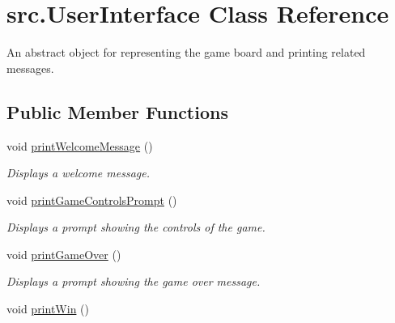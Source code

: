 \hypertarget{classsrc_1_1UserInterface}{}\section{src.\+User\+Interface Class Reference}
\label{classsrc_1_1UserInterface}


An abstract object for representing the game board and printing related messages.  


\subsection*{Public Member Functions}
\begin{DoxyCompactItemize}
\item 
\mbox{\label{classsrc_1_1UserInterface_a30f0e6f6aa7b09b00704c6eb5fff7c1d}} 
void \hyperlink{classsrc_1_1UserInterface_a30f0e6f6aa7b09b00704c6eb5fff7c1d}{print\+Welcome\+Message} ()
\begin{DoxyCompactList}\small\item\em Displays a welcome message. \end{DoxyCompactList}\item 
\mbox{\label{classsrc_1_1UserInterface_a0544e50c7da5b4a7996434556ba3028d}} 
void \hyperlink{classsrc_1_1UserInterface_a0544e50c7da5b4a7996434556ba3028d}{print\+Game\+Controls\+Prompt} ()
\begin{DoxyCompactList}\small\item\em Displays a prompt showing the controls of the game. \end{DoxyCompactList}\item 
\mbox{\label{classsrc_1_1UserInterface_acba54ffce06b835010ed5568239a8f00}} 
void \hyperlink{classsrc_1_1UserInterface_acba54ffce06b835010ed5568239a8f00}{print\+Game\+Over} ()
\begin{DoxyCompactList}\small\item\em Displays a prompt showing the game over message. \end{DoxyCompactList}\item 
\mbox{\label{classsrc_1_1UserInterface_a5b7ad41a8c9a4c4b7852c9c51b3247c4}} 
void \hyperlink{classsrc_1_1UserInterface_a5b7ad41a8c9a4c4b7852c9c51b3247c4}{print\+Win} ()

\end{DoxyCompactItemize}
